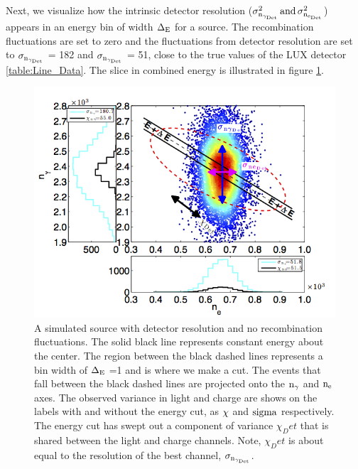 Next, we visualize how the intrinsic detector resolution ($\rm \sigma_{n_{\gamma_{Det}}}^2 \,and\, \sigma_{n_{e_{Det}}}^2 $) appears in an energy bin of width $\rm \Delta_E$ for a \KrCal source. The recombination fluctuations are set to zero and the fluctuations from detector resolution are set to $\rm \sigma_{n_{\gamma_{Det}}}$ = 182 and $\rm \sigma_{n_{\gamma_{Det}}}$ = 51, close to the true values of the LUX detector \ref{table:Line_Data}. The slice in combined energy is illustrated in figure \ref{fig:Kr_ex_R}.

\renewcommand{\baselinestretch}{1}
\small\normalsize
 \begin{figure}[h!]\centering
\includegraphics[width=160mm]{Chapter_Flucs/Figures/Ex_Plots/EX_Stat_Kr_.png}
\caption{A simulated \KrCal source with detector resolution and no recombination fluctuations. The solid black line represents constant energy about the center. The region between the black dashed lines represents a bin width of $\rm \Delta_E$ =1 and is where we make a cut. The events that fall between the black dashed lines are projected onto the $\rm n_\gamma$ and $\rm n_e$ axes. The observed variance in light and charge are shows on the labels with and without the energy cut, as $\rm \chi$ and $\rm sigma$ respectively. The energy cut has swept out a component of variance $\chi_Det$ that is shared between the light and charge channels. Note, $\chi_Det$ is about equal to the resolution of the best channel, $\rm \sigma_{n_{\gamma_{Det}}}$. }
\label{fig:Kr_ex_R}
\end{figure}
\renewcommand{\baselinestretch}{2}
\small\normalsize


